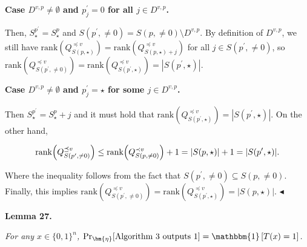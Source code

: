 \documentclass[10pt,a4paper]{article}
\begin{document}
\par\medskip\noindent\textbf{Case $D^{v,p}\neq\emptyset$ and $p^{\prime}_{j}=0$ for all $j\in D^{v,p}$.}\par




Then, $S^{p^{\prime}}_{\star}=S^{p}_{\star}$ and $S(p^{\prime},\neq 0)=S(p,\neq 0)\setminus D^{v,p}$. By definition of $D^{v,p}$, we still have $\mathrm{rank}(Q^{\preceq v}_{S(p,\star)})=\mathrm{rank}(Q^{\preceq v}_{S(p,\star)+j})$ for all $j\in S(p^{\prime},\neq 0)$, so $\mathrm{rank}(Q^{\preceq v}_{S(p^{\prime},\neq 0)})=\mathrm{rank}(Q^{\preceq v}_{S(p^{\prime},\star)})=|S(p^{\prime},\star)|$.\par





\par\medskip\noindent\textbf{Case $D^{v,p}\neq\emptyset$ and $p^{\prime}_{j}=\star$ for some $j\in D^{v,p}$.}\par




Then $S^{p^{\prime}}_{\star}=S_{\star}^{p}+j$ and it must hold that $\mathrm{rank}(Q^{\preceq v}_{S(p^{\prime},\star)})=|S(p^{\prime},\star)|$. On the other hand,\par


\[\begin{gathered}
\mathrm{rank}\Big{(}Q^{\preceq v}_{S(p^{\prime},\neq 0)}\Big{)}\leq\mathrm{rank}\Big{(}Q^{\prec v}_{S(p,\neq 0)}\Big{)}+1=|S(p,\star)|+1=|S(p^{\prime},\star)|.
\end{gathered}\]


Where the inequality follows from the fact that $S(p^{\prime},\neq 0)\subseteq S(p,\neq 0)$. Finally, this implies $\mathrm{rank}(Q^{\preceq v}_{S(p^{\prime},\neq 0)})=\mathrm{rank}(Q^{\preceq v}_{S(p^{\prime},\star)})=|S(p,\star)|$.
$\blacktriangleleft$\par





\par\medskip\noindent\textbf{
\textbf{Lemma 27}\textbf{.}
}\par



\emph{For any $x\in\{0,1\}^{n}$, $\Pr_{\bm{\eta}}[\textup{Algorithm 3 outputs $1$}]=\mathbbm{1}\left[T(x)=1\right]$.}\par
\end{document}
